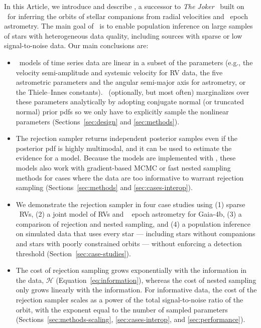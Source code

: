 \documentclass[twocolumn]{AASTeX7/aastex701}
\newcommand{\harv}{\package{harv}}
\newcommand{\joker}{\textsl{The Joker}}
\begin{document}
In this Article, we introduce and describe \harv, a successor to \joker\
\citep{Price-Whelan:2017} built on \jax\ for inferring the orbits of stellar companions
from radial velocities and \gaia\ epoch astrometry.
The main goal of \harv\ is to enable population inference on large samples of stars with
heterogeneous data quality, including sources with sparse or low signal-to-noise data.
Our main conclusions are:
\begin{itemize}
  \item \harv\ models of time series data are linear in a subset of the parameters
    (e.g., the velocity semi-amplitude and systemic velocity for RV data, the five
    astrometric parameters and the angular semi-major axis for astrometry, or the
    Thiele--Innes constants).
    \harv\ (optionally, but most often) marginalizes over these parameters analytically
    by adopting conjugate normal (or truncated normal) prior pdfs so we only have to
    explicitly sample the nonlinear parameters (Sections~\ref{sec:design} and
    \ref{sec:methods}).
  \item The rejection sampler returns independent posterior samples even if the
    posterior pdf is highly multimodal, and it can be used to estimate the evidence for
    a model.
    Because the models are implemented with \jax, these models also work with
    gradient-based MCMC or fast nested sampling methods for cases where the data are too
    informative to warrant rejection sampling (Sections~\ref{sec:methods} and
    \ref{sec:cases-interop}).
  \item We demonstrate the rejection sampler in four case studies using (1) sparse
    \apogee\ RVs, (2) a joint model of RVs and \gaia\ \dr{4} epoch astrometry for
    Gaia-4b, (3) a comparison of rejection and nested sampling, and (4) a population
    inference on simulated data that uses every star --- including stars without
    companions and stars with poorly constrained orbits --- without enforcing a
    detection threshold (Section~\ref{sec:case-studies}).
  \item The cost of rejection sampling grows exponentially with the information in the
    data, $\mathcal{H}$ (Equation~\ref{eq:information}), whereas the cost of nested
    sampling only grows linearly with the information.
    For informative data, the cost of the rejection sampler scales as a power of the
    total signal-to-noise ratio of the orbit, with the exponent equal to the number of
    sampled parameters (Sections~\ref{sec:methods-scaling}, \ref{sec:cases-interop}, and
    \ref{sec:performance}).

\end{itemize}
\end{document}
